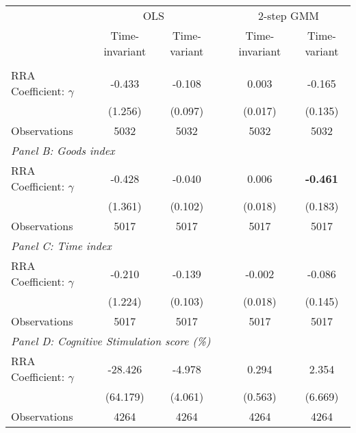 {
\begin{tabular}{l*{5}{c}}
\toprule
                &\multicolumn{2}{c}{OLS} && \multicolumn{2}{c}{2-step GMM}\\ \cline{2-3} \cline{5-6}
                	& Time-invariant & Time-variant && Time-invariant & Time-variant \\
\midrule
\addlinespace \multicolumn{6}{l}{\textit{Panel A: HOME index}} \\
RRA Coefficient: $\gamma$&   -0.433         &     -0.108      &       &    0.003         &       -0.165           \\
                &  (1.256)         &      (0.097)           & &  (0.017)         &       (0.135)           \\
\midrule
Observations    &     5032         &     5032   &      &     5032         &     5032         \\

\midrule

 \multicolumn{6}{l}{\textit{Panel B: Goods index}} \\
RRA Coefficient: $\gamma$&   -0.428         &      -0.040     &       &    0.006         &     \textbf{-0.461\sym{**} }            \\
                &  (1.361)         &       (0.102)          & &  (0.018)         &        (0.183)          \\
\midrule
Observations    &     5017         &     5017    &     &     5017         &     5017         \\

\midrule

 \multicolumn{6}{l}{\textit{Panel C: Time index}} \\
RRA Coefficient: $\gamma$&   -0.210         &      -0.139       &     &   -0.002         &         -0.086           \\
                &  (1.224)         &       (0.103)          & &  (0.018)         &         (0.145)         \\
\midrule
Observations    &     5017         &     5017         & &    5017         &     5017         \\

\midrule

 \multicolumn{6}{l}{\textit{Panel D: Cognitive Stimulation score (\%)}} \\
RRA Coefficient: $\gamma$&  -28.426         &     -4.978  &            &    0.294         &      2.354               \\
                & (64.179)         &       (4.061)          & &  (0.563)         &        (6.669)           \\
\addlinespace
\midrule
Observations    &     4264         &     4264         &   &  4264         &     4264         \\


\end{tabular}}
